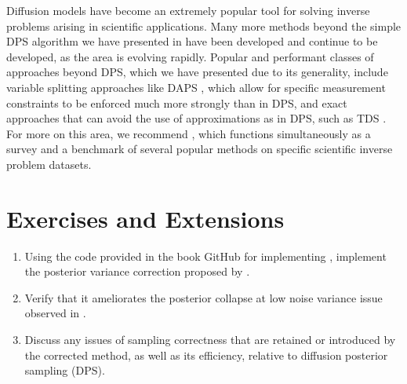 \documentclass[../../book-main.tex]{subfiles}
\begin{document}
Diffusion models have become an extremely popular tool for solving inverse
problems arising in scientific applications. Many more methods beyond the simple
DPS algorithm we have presented in  have been
developed and continue to be developed, as the area is evolving rapidly.
Popular and performant classes of approaches beyond DPS, which we have presented
due to its generality, include variable splitting approaches like DAPS
\cite{Zhang2024-ha},
which allow for specific measurement constraints to be enforced much more
strongly than in DPS, and exact approaches that can avoid the use of
approximations as in DPS, such as TDS \cite{wu2023practical}.
For more on this area, we recommend \cite{zheng2025inversebench}, which
functions simultaneously as a survey and a benchmark of several popular methods
on specific scientific inverse problem datasets.

\section{Exercises and Extensions}


\begin{exercise}

  \begin{enumerate}
    \item Using the code provided in the book GitHub for implementing
      , implement the
      posterior variance correction proposed by \textcite{rozet2024learning}.
    \item Verify that it ameliorates the posterior collapse at low noise
      variance issue observed in
      .
    \item Discuss any issues of sampling correctness that are retained or
      introduced by the corrected method, as well as its efficiency, relative to
      diffusion posterior sampling (DPS).
  \end{enumerate}

\end{exercise}
\end{document}
